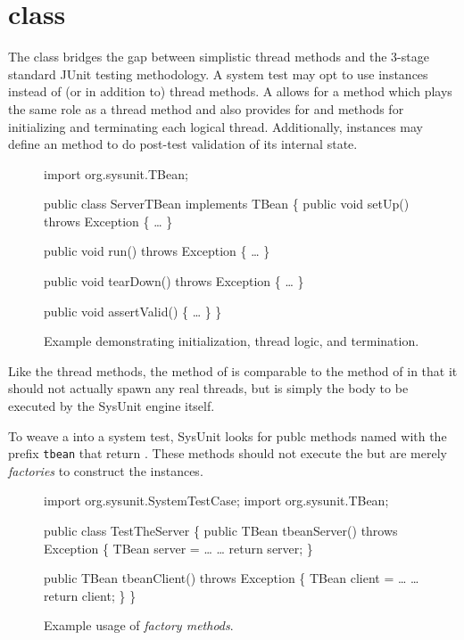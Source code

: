 \section{ class}

The  class bridges the gap between simplistic
thread methods and the 3-stage standard JUnit testing methodology.
A system test may opt to use  instances instead of
(or in addition to) thread methods.  A  allows
for a  method which plays the same role
as a thread method and also provides for 
and  methods for initializing and
terminating each logical thread.
Additionally,  instances may define an
 method to do post-test 
validation of its internal state.

\begin{figure}
\begin{codelisting}
import org.sysunit.TBean;

public class ServerTBean 
    implements TBean
\{
    public void setUp()
        throws Exception
    \{
        \dots
    \}

    public void run()
         throws Exception
    \{
        \dots
    \}

    public void tearDown()
        throws Exception
    \{
        \dots
    \}

    public void assertValid()
    \{
        \dots
    \}
\}
\end{codelisting}
\caption{Example  demonstrating initialization,
thread logic, and termination.}
\end{figure}

Like the thread methods, the  method of
 is comparable to the  method of
 in that it should not actually spawn any real
threads, but is simply the body to be executed by the SysUnit engine
itself. 

To weave a  into a system test, SysUnit looks for
publc methods named with the prefix \texttt{tbean} that return
.  These methods should not execute the 
but are merely \emph{factories} to
construct the  instances.

\begin{figure}
\begin{codelisting}
import org.sysunit.SystemTestCase;
import org.sysunit.TBean;

public class TestTheServer 
\{
    public TBean tbeanServer()
        throws Exception 
    \{
        TBean server = \dots
        \dots
        return server;
    \}

    public TBean tbeanClient()
        throws Exception 
    \{
        TBean client = \dots
        \dots
        return client;
    \}
\}
\end{codelisting}
\caption{Example usage of \emph{ factory methods}.}
\end{figure}

